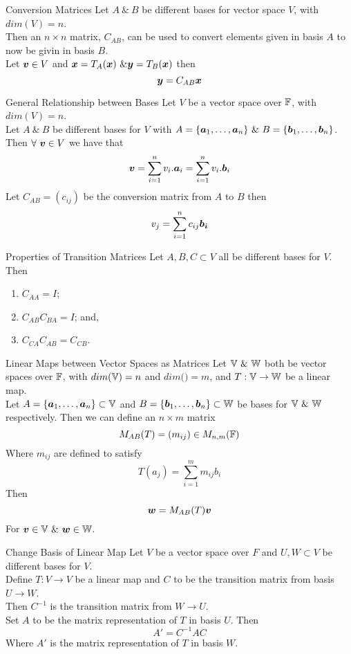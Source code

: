 \documentclass[11pt,a4paper]{article}
\begin{document}
\subtitle{Theorem 7.27 - }{Conversion Matrices}
Let $A\ \&\ B$ be different bases for vector space $V$, with $dim(V) = n$.\\
Then an $n \times n$ matrix, $C_{AB}$, can be used to convert elements given in basis $A$ to now be givin in basis $B$.\\
Let $\boldsymbol{v} \in V$ and $\boldsymbol{x} = T_{A}(\boldsymbol{x})\ \& \boldsymbol{y} = T_{B}(\boldsymbol{x})$ then $$\boldsymbol{y} = C_{AB}\boldsymbol{x}$$

\subtitle{Theorem 7.28 - }{General Relationship between Bases}
Let $V$ be a vector space over $\mathbb{F}$, with $dim(V) = n$.\\
Let $A\ \&\ B$ be different bases for $V$ with $A = \{\vect{a}_1 , \dots , \vect{a}_n\}\ \&\ B = \{\vect{b}_1 , \dots , \vect{b}_n\}$.\\
Then $\forall\ \boldsymbol{v} \in V$ we have that $$\boldsymbol{v} = \sum_{i=1}^{n} v_i . \boldsymbol{a}_i = \sum_{i=1}^{n} v_i . \boldsymbol{b}_i $$
Let $C_{AB} = (c_{ij})$ be the conversion matrix from $A$ to $B$ then $$v_j = \sum_{i=1}^{n} c_{ij}\boldsymbol{b_i}$$

\subtitle{Theorem 7.29 - }{Properties of Transition Matrices}
Let $A, B, C \subset V$ all be different bases for $V$. Then
\begin{enumerate}[label=\roman*)]
  \item $C_{AA} = I$;
  \item $C_{AB}C_{BA} = I$; and,
  \item $C_{CA}C_{AB} = C_{CB}$.\\
\end{enumerate}

\subtitle{Theorem 7.30 - }{Linear Maps between Vector Spaces as Matrices}
Let $\mathbb{V}\ \&\ \mathbb{W}$ both be vector spaces over $\mathbb{F}$, with $dim(\mathbb{V}) = n$ and $dim(\mathbb) = m$, and $T : \mathbb{V} \to \mathbb{W}$ be a linear map.\\
Let $A = \{\boldsymbol{a}_1, \dots , \boldsymbol{a}_n\} \subset \mathbb{V}$ and $B = \{\boldsymbol{b}_1, \dots , \boldsymbol{b}_n\} \subset \mathbb{W}$ be bases for $\mathbb{V}\ \&\ \mathbb{W}$ respectively.
Then we can define an $n \times m$ matrix $$M_{AB}(T) = (m_{ij}) \in M_{n,m}(\mathbb{F})$$
Where $m_{ij}$ are defined to satisfy
$$T(a_j) = \sum_{i=1}^{m} m_{ij}b_i$$
Then
$$\boldsymbol{w} = M_{AB}(T)\boldsymbol{v}$$
For $\vect{v} \in \vectorspace\ \&\ \vect{w} \in \mathbb{W}$.\\

\subtitle{Theorem 7.31 - }{Change Basis of Linear Map}
Let $V$ be a vector space over $F$ and $U, W \subset V$ be different bases for $V$.\\
Define $T : V \to V$ be a linear map and $C$ to be the transition matrix from basis $U \to W$.\\
Then $C^{-1}$ is the transition matrix from $W \to U$.\\
Set $A$ to be the matrix representation of $T$ in basis $U$. Then
$$A' = C^{-1}AC$$
Where $A'$ is the matrix representation of $T$ in basis $W$.
\end{document}
